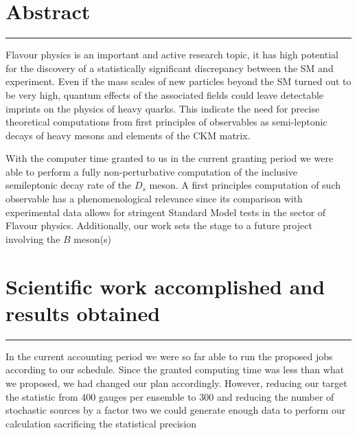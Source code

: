 \documentclass [a4paper, 11pt]{article}
\begin{document}
\newpage

\vfill
\tableofcontents
\vfill

\newpage

\section{Abstract}\label{sec:abstract}
\rule{\textwidth}{0.4pt}


Flavour physics is an important and active research topic, it has high potential
for the discovery of a statistically significant discrepancy between the SM and
experiment.
Even if the mass scales of new
particles beyond the SM turned out to be very high, quantum effects of
the associated fields could leave detectable imprints on the physics
of heavy quarks.
This indicate the need for precise theoretical computations from first principles of observables as semi-leptonic decays of heavy mesons and elements of the CKM matrix.

With the computer time granted to us in the current granting period we
were able to perform a fully non-perturbative computation of the inclusive semileptonic
decay rate of the $D_s$ meson.
A first principles computation of such observable has a
phenomenological relevance since its comparison with experimental data
allows for stringent Standard Model tests in the sector of Flavour physics.
Additionally, our work sets the stage to a future
project involving the $B$ meson(s)



\section{Scientific work accomplished and results obtained}\label{sec:results}
\rule{\textwidth}{0.4pt}

In the current accounting period we were so far able to run the
proposed jobs according to our schedule. Since the granted computing
time was less than what we proposed, we had changed our plan
accordingly.
However, reducing our target the statistic from 400 gauges per ensemble to 300 and reducing the
number of stochastic sources by a factor two
we could
generate enough data to perform our calculation sacrificing the statistical precision
\end{document}
